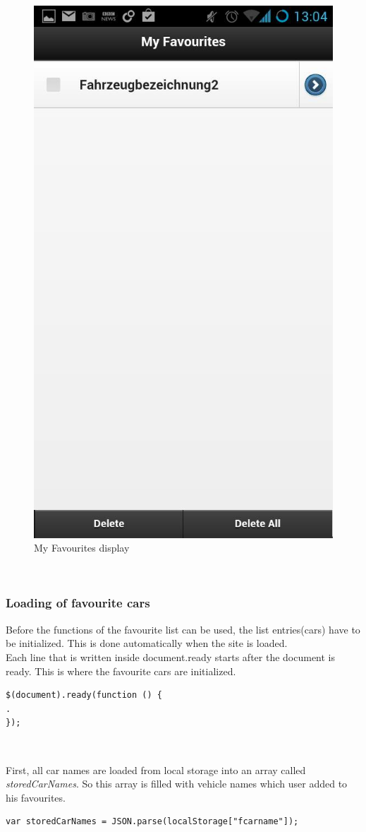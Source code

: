 \begin{figure}[h]
\centering
\includegraphics[width=0.4\linewidth]{graphics/chapter4/15}
\caption{My Favourites display}
\end{figure}
\



\subsubsection{Loading of favourite cars}
Before the functions of the favourite list can be used, the list entries(cars) have to be initialized. This is done automatically when the site is loaded. 
\\

Each line that is written inside document.ready starts after the document is ready. This is where the favourite cars are initialized.
\\
\newline
\newline

\begin{lstlisting}[language=html, caption= 
source for document is ready,captionpos=b]
$(document).ready(function () {
.
});
\end{lstlisting}
\

First, all car names are loaded from local storage into an array called \textit{storedCarNames}. So this array is filled with vehicle names which user added to his favourites. 
\\

\begin{lstlisting}[language=html, caption= 
Array with favourite cars,captionpos=b]
var storedCarNames = JSON.parse(localStorage["fcarname"]); 
\end{lstlisting}
\


